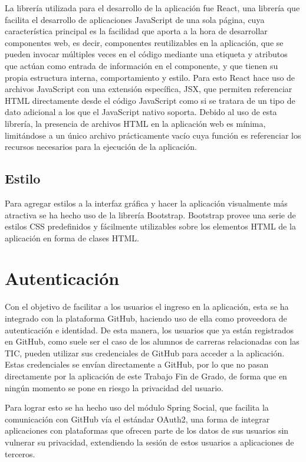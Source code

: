 \documentclass[a4paper, 12pt]{book}
\begin{document}
La librería utilizada para el desarrollo de la aplicación fue React, una librería que facilita el desarrollo de aplicaciones JavaScript de una sola página, cuya característica principal es la facilidad que aporta a la hora de desarrollar componentes web, es decir, 
componentes reutilizables en la aplicación, que se pueden invocar múltiples veces en el código mediante una etiqueta y atributos que actúan como entrada de información en el componente, y que tienen su propia estructura interna, comportamiento y estilo. 
Para esto React hace uso de archivos JavaScript con una extensión específica, JSX, que permiten referenciar HTML directamente desde el código JavaScript como si se tratara de un tipo de dato adicional a los que el JavaScript nativo soporta. 
Debido al uso de esta librería, la presencia de archivos HTML en la aplicación web es mínima, limitándose a un único archivo prácticamente vacío cuya función es referenciar los recursos necesarios para la ejecución de la aplicación.


\subsection{Estilo}
\label{subsec:intro_webapplication_style}

Para agregar estilos a la interfaz gráfica y hacer la aplicación visualmente más atractiva se ha hecho uso de la librería Bootstrap. Bootstrap provee una serie de estilos CSS predefinidos y fácilmente utilizables sobre los elementos HTML de la aplicación en forma de clases HTML.

\section{Autenticación}
\label{sec:intro_authentication}

Con el objetivo de facilitar a los usuarios el ingreso en la aplicación, esta se ha integrado con la plataforma GitHub, haciendo uso de ella como proveedora de autenticación e identidad. De esta manera, los usuarios que ya están registrados en GitHub, como suele ser el caso de los alumnos de carreras relacionadas con las TIC, pueden utilizar sus credenciales de GitHub para acceder a la aplicación. Estas credenciales se envían directamente a GitHub, por lo que no pasan directamente por la aplicación de este Trabajo Fin de Grado, de forma que en ningún momento se pone en riesgo la privacidad del usuario.

Para lograr esto se ha hecho uso del módulo Spring Social, que facilita la comunicación con GitHub vía el estándar OAuth2, una forma de integrar aplicaciones con plataformas que ofrecen parte de los datos de sus usuarios sin vulnerar su privacidad, extendiendo la sesión de estos usuarios a aplicaciones de terceros.
\end{document}
